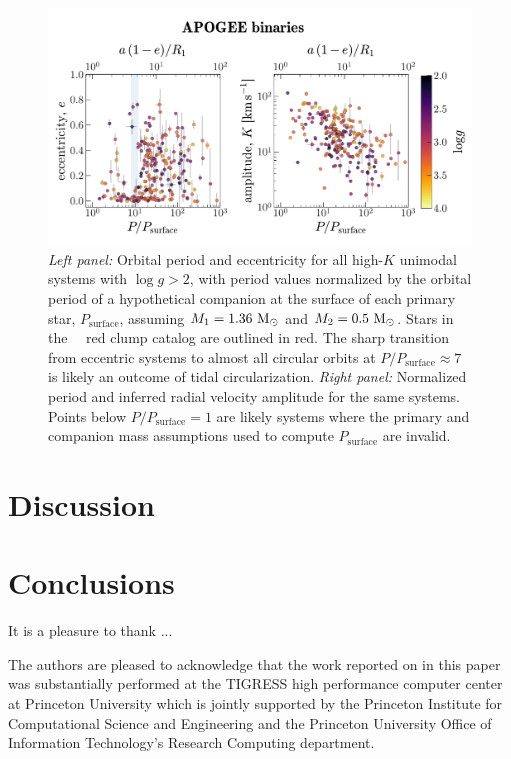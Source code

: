 \documentclass[modern, letterpaper]{aastex62}
\newcommand{\apogee}{\project{\acronym{APOGEE}}}
\newcommand{\DR}{\acronym{DR14}}
\begin{document}
\begin{figure}[h]
\begin{center}
\includegraphics[width=\textwidth]{P-e-K}
\end{center}
\caption{%
\textit{Left panel:} Orbital period and eccentricity for all high-$K$ unimodal
systems with $\log g > 2$, with period values normalized by the orbital period
of a hypothetical companion at the surface of each primary star,
$P_{\textrm{surface}}$, assuming $M_1 = 1.36~\mathrm{M}_\odot$ and $M_2 =0.5~\mathrm{M}_\odot$.
Stars in the \apogee\ \DR\ red clump catalog are outlined in red.
The sharp transition from eccentric systems to almost all circular orbits at
$P/P_\textrm{surface} \approx 7$ is likely an outcome of tidal circularization.
\textit{Right panel:} Normalized period and inferred radial velocity amplitude
for the same systems.
Points below $P/P_\textrm{surface} = 1$ are likely systems where the primary and
companion mass assumptions used to compute $P_\textrm{surface}$ are invalid.
\label{fig:PeK}
}
\end{figure}


\section{Discussion}


\section{Conclusions}



\acknowledgements

It is a pleasure to thank ...

The authors are pleased to acknowledge that the work reported on in this
paper was substantially performed at the TIGRESS high performance computer
center at Princeton University which is jointly supported by the Princeton
Institute for Computational Science and Engineering and the Princeton
University Office of Information Technology's Research Computing department.
\end{document}
